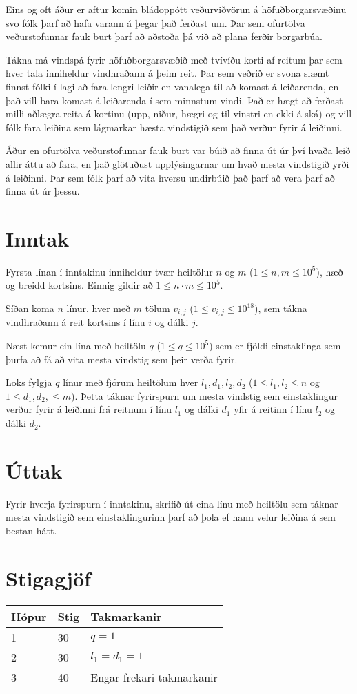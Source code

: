 %
Eins og oft áður er aftur komin bládoppótt veðurviðvörun á höfuðborgarsvæðinu svo
fólk þarf að hafa varann á þegar það ferðast um. Þar sem ofurtölva veðurstofunnar
fauk burt þarf að aðstoða þá við að plana ferðir borgarbúa.

Tákna má vindspá fyrir
höfuðborgarsvæðið með tvívíðu korti af reitum þar sem hver tala inniheldur vindhraðann
á þeim reit. Þar sem veðrið er svona slæmt finnst fólki í lagi að fara lengri leiðir
en vanalega til að komast á leiðarenda, en það vill bara komast á leiðarenda í sem
minnstum vindi. Það er hægt að ferðast milli aðlægra reita á kortinu (upp, niður, hægri
og til vinstri en ekki á ská) og vill fólk fara leiðina sem lágmarkar hæsta vindstigið
sem það verður fyrir á leiðinni.

Áður en ofurtölva veðurstofunnar fauk burt var
búið að finna út úr því hvaða leið allir áttu að fara, en það glötuðust upplýsingarnar
um hvað mesta vindstigið yrði á leiðinni. Þar sem fólk þarf að vita hversu undirbúið
það þarf að vera þarf að finna út úr þessu.

\section*{Inntak}
Fyrsta línan í inntakinu inniheldur tvær heiltölur $n$ og $m$ ($1 \leq n, m \leq
10^5$), hæð og breidd kortsins. Einnig gildir að $1 \leq n\cdot m \leq 10^5$.

Síðan koma $n$ línur, hver með $m$ tölum $v_{i,j}$ ($1 \leq v_{i,j} \leq 10^{18}$),
sem tákna vindhraðann á reit kortsins í línu $i$ og dálki $j$. 

Næst kemur ein lína með heiltölu $q$ ($1 \leq q \leq 10^5$) sem er fjöldi
einstaklinga sem þurfa að fá að vita mesta vindstig sem þeir verða fyrir. 

Loks fylgja $q$ línur með fjórum heiltölum hver $l_1, d_1, l_2, d_2$ ($1 \leq l_1, l_2 \leq n$
og $1 \leq d_1, d_2, \leq m$). Þetta táknar fyrirspurn um mesta vindstig sem einstaklingur verður
fyrir á leiðinni frá reitnum í línu $l_1$ og dálki $d_1$ yfir á reitinn í línu $l_2$ og dálki $d_2$.

\section*{Úttak}
Fyrir hverja fyrirspurn í inntakinu, skrifið út eina línu með heiltölu sem
táknar mesta vindstigið sem einstaklingurinn þarf að þola ef hann velur leiðina
á sem bestan hátt.

\section*{Stigagjöf}
\begin{tabular}{|l|l|l|}
\hline
Hópur & Stig & Takmarkanir \\ \hline
1     & 30   & $q = 1$ \\ \hline
2     & 30   & $l_1 = d_1 = 1$ \\ \hline
3     & 40   & Engar frekari takmarkanir\\ \hline
\end{tabular}

